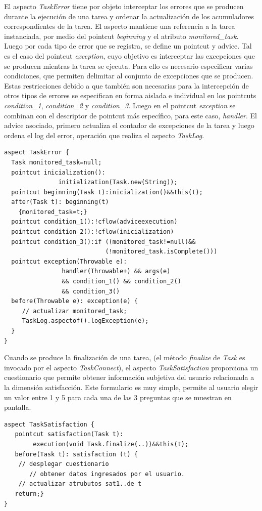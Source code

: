 El aspecto \textit{TaskError} tiene por objeto interceptar los errores que se producen durante la ejecución de una tarea y ordenar la actualización de los acumuladores correspondientes de la tarea. El aspecto mantiene una referencia a la tarea instanciada, por medio del pointcut \textit{beginning} y el atributo \textit{monitored\_task}. Luego por cada tipo de error que se registra, se define un pointcut y advice. Tal es el caso del pointcut \textit{exception}, cuyo objetivo es interceptar las excepciones que se producen mientras la tarea se ejecuta. Para ello es necesario especificar varias condiciones, que permiten delimitar al conjunto de excepciones que se producen. Estas restricciones debido a que también son necesarias para la intercepción de otros tipos de errores se especifican en forma aislada e individual en los pointcuts \textit{condition\_1}, \textit{condition\_2} y \textit{condition\_3}. Luego en el pointcut \textit{exception} se combinan con el descriptor de pointcut más específico, para este caso, \textit{handler}. El advice asociado, primero actualiza el contador de excepciones de la tarea y luego ordena el log del error, operación que realiza el aspecto \textit{TaskLog}. 
\squeezeup
\begin{verbatim}
aspect TaskError {
  Task monitored_task=null;
  pointcut inicialization():    
               initialization(Task.new(String));
  pointcut beginning(Task t):inicialization()&&this(t);
  after(Task t): beginning(t)
    {monitored_task=t;} 
  pointcut condition_1():!cflow(adviceexecution)
  pointcut condition_2():!cflow(inicialization) 
  pointcut condition_3():if ((monitored_task!=null)&&
                            (!monitored_task.isComplete()))
  pointcut exception(Throwable e): 
                handler(Throwable+) && args(e)
                && condition_1() && condition_2()
                && condition_3()
  before(Throwable e): exception(e) {
     // actualizar monitored_task;
     TaskLog.aspectof().logException(e);
  }
}
\end{verbatim}
\squeezeup

Cuando se produce la finalización de una tarea, (el método \textit{finalize} de \textit{Task} es invocado por el aspecto \textit{TaskConnect}), el aspecto \textit{TaskSatisfaction} proporciona un cuestionario que permite obtener información subjetiva del usuario relacionada a la dimensión satisfacción. Este formulario es muy simple, permite al usuario elegir un valor entre 1 y 5 para cada una de las 3 preguntas que se muestran en pantalla. 
\squeezeup
\begin{verbatim}
aspect TaskSatisfaction {
   pointcut satisfaction(Task t):
        execution(void Task.finalize(..))&&this(t);	
   before(Task t): satisfaction (t) {
	// desplegar cuestionario 
       // obtener datos ingresados por el usuario.
	// actualizar atrubutos sat1..de t
   return;}
}
\end{verbatim}
\squeezeup

